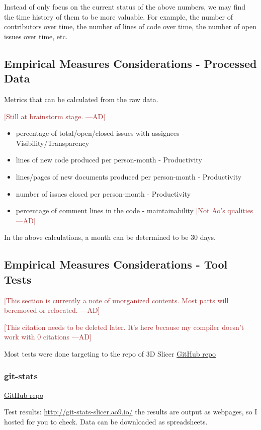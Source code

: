 \documentclass[letterpaper,cleveref]{lipics-v2019}
\newcommand{\authornote}[3]{\textcolor{#1}{[#3 ---#2]}}
\newcommand{\authornote}[3]{}
\newcommand{\ad}[1]{\authornote{brown}{AD}{#1}} %
\theoremstyle{definition}
\begin{document}
Instead of only focus on the current status of the above numbers, we may find
the time history of them to be more valuable. For example, the number of
contributors over time, the number of lines of code over time, the number of
open issues over time, etc.

\subsection{Empirical Measures Considerations - Processed Data}

Metrics that can be calculated from the raw data.

\ad{Still at brainstorm stage.}
\begin{itemize}
\item percentage of total/open/closed issues with assignees -
  Visibility/Transparency
\item lines of new code produced per person-month - Productivity
\item lines/pages of new documents produced per person-month - Productivity
\item number of issues closed per person-month - Productivity
\item percentage of comment lines in the code - maintainability \ad{Not Ao's
    qualities}
\end{itemize}

In the above calculations, a month can be determined to be 30 days.

\subsection{Empirical Measures Considerations - Tool Tests}

\ad{This section is currently a note of unorganized contents. Most parts will
  beremoved or relocated.}

\ad{This citation needs to be deleted later. It's here because my compiler
  doesn't work with 0 citations} \cite{Emms2019}

Most tests were done targeting to the repo of 3D Slicer
\href{https://github.com/tomgi/git_stats}{GitHub repo}

\subsubsection{git-stats}

\href{https://github.com/tomgi/git_stats}{GitHub repo}

Test results:
\href{http://git-stats-slicer.ao9.io/}{http://git-stats-slicer.ao9.io/} the
results are output as webpages, so I hosted for you to check. Data can be
downloaded as spreadsheets.
\end{document}
